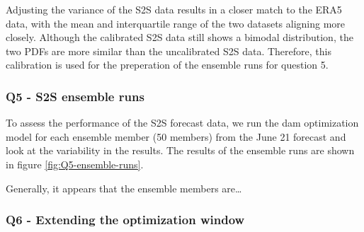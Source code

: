 \documentclass[11pt]{article}
\begin{document}
Adjusting the variance of the S2S data results in a closer match to the ERA5 data, with the mean and interquartile range of the two datasets aligning more closely. Although the calibrated S2S data still shows a bimodal distribution, the two PDFs are more similar than the uncalibrated S2S data. Therefore, this calibration is used for the preperation of the ensemble runs for question 5.\\

\subsubsection*{Q5 - S2S ensemble runs}

To assess the performance of the S2S forecast data, we run the dam optimization model for each ensemble member (50 members) from the June 21 forecast and look at the variability in the results. The results of the ensemble runs are shown in figure \ref*{fig:Q5-ensemble-runs}.



Generally, it appears that the ensemble members are\dots

\subsubsection*{Q6 - Extending the optimization window}
\end{document}
